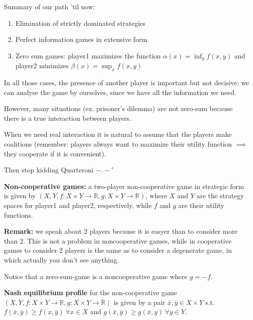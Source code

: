 
%


\noindent Summary of our path 'til now:
\begin{enumerate}
	\item Elimination of strictly dominated strategies
	\item Perfect information games in extensive form
	\item Zero sum games: player1 maximizes the function
		$\alpha(x) = \inf_y{f(x,y)}$ and player2 minimizes
		$\beta(x) = \sup_x{f(x,y)}$
\end{enumerate}
In all those cases, the presence of another player is important but not 
decisive: we can analyse the game by ourselves, since we have all the 
information we need.

\noindent However, many situations (ex. prisoner's dilemma) are not 
zero-sum because there is a true interaction between players.

\noindent When we need real interaction it is natural to assume that the 
players make coalitions (remember: players always want to maximize 
their utility function $\implies$ they cooperate if it is convenient).

{\huge Then stop kidding Quarteroni $-.-'$ }

\bigskip
\noindent \textbf{Non-cooperative games:} a two-player non-cooperative 
game in strategic form is given by $(X,Y,
f:X \times Y \rightarrow \mathbb{R}, g:X \times Y \rightarrow \mathbb{R})$, 
where $X$ and $Y$ are the strategy spaces for player1 and player2, 
respectively, while $f$ and $g$ are their utility functions.

\bigskip
\noindent \textbf{Remark:} we speak about 2 players because it is easyer 
than to consider more than 2. This is not a problem in noncooperative 
games, while in cooperative games to consider 2 players is the same as 
to consider a degenerate game, in which actually you don't see anything.

\bigskip
\noindent Notice that a zero-sum-game is a noncooperative game where 
$g=-f$.

\bigskip
\noindent \textbf{Nash equilibrium profile} for the non-cooperative game 
$(X,Y, f:X \times Y \rightarrow \mathbb{R}, 
g:X \times Y \rightarrow \mathbb{R})$ is given by a pair $\bar{x},\bar{y} 
\in X \times Y$ s.t. $f(\bar{x},\bar{y}) \geq f(x,\bar{y}) ~\forall x \in X$ and 
$g(\bar{x},\bar{y}) \geq g(\bar{x},y) ~\forall y \in Y$.

